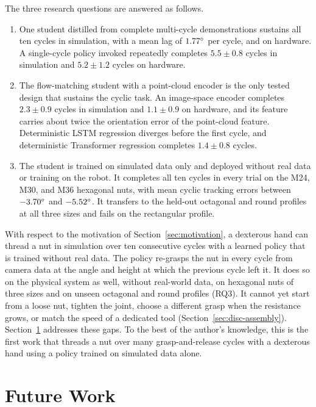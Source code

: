 The three research questions are answered as follows.
\begin{enumerate}
  \item[RQ1] One student distilled from complete multi-cycle demonstrations sustains all ten cycles in simulation, with a mean lag of $1.77^\circ$ per cycle, and on hardware. A single-cycle policy invoked repeatedly completes $5.5\pm0.8$ cycles in simulation and $5.2\pm1.2$ cycles on hardware.
  \item[RQ2] The flow-matching student with a point-cloud encoder is the only tested design that sustains the cyclic task. An image-space encoder completes $2.3\pm0.9$ cycles in simulation and $1.1\pm0.9$ on hardware, and its feature carries about twice the orientation error of the point-cloud feature. Deterministic \ac{LSTM} regression diverges before the first cycle, and deterministic Transformer regression completes $1.4\pm0.8$ cycles.
  \item[RQ3] The student is trained on simulated data only and deployed without real data or training on the robot. It completes all ten cycles in every trial on the M24, M30, and M36 hexagonal nuts, with mean cyclic tracking errors between $-3.70^\circ$ and $-5.52^\circ$. It transfers to the held-out octagonal and round profiles at all three sizes and fails on the rectangular profile.
\end{enumerate}

With respect to the motivation of Section~\ref{sec:motivation}, a dexterous hand can thread a nut in simulation over ten consecutive cycles with a learned policy that is trained without real data. The policy re-grasps the nut in every cycle from camera data at the angle and height at which the previous cycle left it. It does so on the physical system as well, without real-world data, on hexagonal nuts of three sizes and on unseen octagonal and round profiles (RQ3). It cannot yet start from a loose nut, tighten the joint, choose a different grasp when the resistance grows, or match the speed of a dedicated tool (Section~\ref{sec:disc-assembly}). Section~\ref{sec:future-work} addresses these gaps. To the best of the author's knowledge, this is the first work that threads a nut over many grasp-and-release cycles with a dexterous hand using a policy trained on simulated data alone.

\section{Future Work}\label{sec:future-work}

